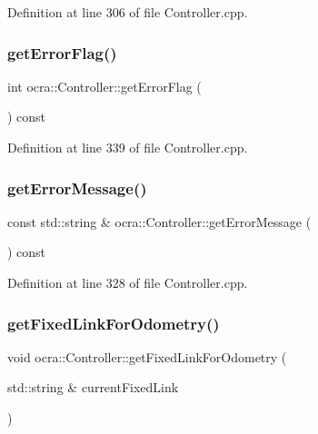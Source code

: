 Definition at line 306 of file Controller.\+cpp.

\hypertarget{classocra_1_1Controller_a5fdf44f2acf693f69a68cc95ce4182b4}{}\label{classocra_1_1Controller_a5fdf44f2acf693f69a68cc95ce4182b4} 
\subsubsection{\texorpdfstring{get\+Error\+Flag()}{getErrorFlag()}}
{\footnotesize\ttfamily int ocra\+::\+Controller\+::get\+Error\+Flag (\begin{DoxyParamCaption}{ }\end{DoxyParamCaption}) const}



Definition at line 339 of file Controller.\+cpp.

\hypertarget{classocra_1_1Controller_a63c3529263ba2cf24f56f5998fa882b3}{}\label{classocra_1_1Controller_a63c3529263ba2cf24f56f5998fa882b3} 
\subsubsection{\texorpdfstring{get\+Error\+Message()}{getErrorMessage()}}
{\footnotesize\ttfamily const std\+::string \& ocra\+::\+Controller\+::get\+Error\+Message (\begin{DoxyParamCaption}{ }\end{DoxyParamCaption}) const}



Definition at line 328 of file Controller.\+cpp.

\hypertarget{classocra_1_1Controller_ad134da18dc753e50e6f615373fbf9adf}{}\label{classocra_1_1Controller_ad134da18dc753e50e6f615373fbf9adf} 
\subsubsection{\texorpdfstring{get\+Fixed\+Link\+For\+Odometry()}{getFixedLinkForOdometry()}}
{\footnotesize\ttfamily void ocra\+::\+Controller\+::get\+Fixed\+Link\+For\+Odometry (\begin{DoxyParamCaption}\item[{std\+::string \&}]{current\+Fixed\+Link }\end{DoxyParamCaption})\hspace{0.3cm}{\ttfamily [inline]}}



